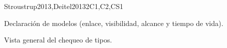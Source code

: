 \begin{syllabus}
\begin{unit}{\PLBasicTypeSystems}{}{Stroustrup2013,Deitel2013}{2}{C1,C2,CS1}
    \begin{topics}
        \item \PLBasicTypeSystemsTopicA        
        \item Declaración de modelos (enlace, visibilidad, alcance y tiempo de vida).
        \item Vista general del chequeo de tipos.
    \end{topics}
    \begin{learningoutcomes}
        \item \PLBasicTypeSystemsLOForBoth [\Familiarity] 
        \item \PLBasicTypeSystemsLOForA [\Familiarity] 
        \item \PLBasicTypeSystemsLODescribeExamples [\Familiarity] 
        \item \PLBasicTypeSystemsLOForMultiple [\Usage] 
        \item \PLBasicTypeSystemsLOGiveAnThat [\Familiarity] 
        \item \PLBasicTypeSystemsLOUseTypes [\Usage] 
        \item \PLBasicTypeSystemsLOExplainHowDefine [\Familiarity] 
        \item \PLBasicTypeSystemsLOWriteDown [\Usage] 
        \item \PLBasicTypeSystemsLOExplainWhyType [\Familiarity] 
        \item \PLBasicTypeSystemsLODefineAndPieces [\Usage] 
        \item \PLBasicTypeSystemsLODiscussTheGenerics [\Familiarity] 
        \item \PLBasicTypeSystemsLOExplainMultiple [\Familiarity] 
    \end{learningoutcomes}
\end{unit}


\end{syllabus}
